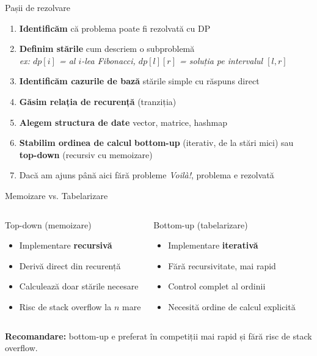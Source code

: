 \documentclass{beamer}
\begin{document}
\begin{frame}{Pașii de rezolvare}
  \begin{enumerate}
    \footnotesize\itemsep2pt
    \item \textbf{Identificăm} că problema poate fi rezolvată cu DP
    \item \textbf{Definim stările} \textemdash{} cum descriem o subproblemă \\
          \textit{ex: $dp[i]$ = al $i$-lea Fibonacci, $dp[l][r]$ = soluția pe intervalul $[l,r]$}
    \item \textbf{Identificăm cazurile de bază} \textemdash{} stările simple cu răspuns direct
    \item \textbf{Găsim relația de recurență} (tranziția)
    \item \textbf{Alegem structura de date} \textemdash{} vector, matrice, hashmap
    \item \textbf{Stabilim ordinea de calcul} \textemdash{} \textbf{bottom-up} (iterativ,
          de la stări mici) sau \textbf{top-down} (recursiv cu memoizare)
    \item Dacă am ajuns până aici fără probleme \textemdash{} \textit{Voilà!}, problema e rezolvată
  \end{enumerate}
\end{frame}

\begin{frame}{Memoizare vs. Tabelarizare}
  \begin{columns}[T]
    \begin{block}{Top-down (memoizare)}
      \begin{itemize}
        \footnotesize\itemsep0pt
        \item Implementare \textbf{recursivă}
        \item[+] Derivă direct din recurență
        \item[+] Calculează doar stările necesare
        \item[$-$] Risc de stack overflow la $n$ mare
      \end{itemize}
    \end{block}
    \begin{block}{Bottom-up (tabelarizare)}
      \begin{itemize}
        \footnotesize\itemsep0pt
        \item Implementare \textbf{iterativă}
        \item[+] Fără recursivitate, mai rapid
        \item[+] Control complet al ordinii
        \item[$-$] Necesită ordine de calcul explicită
      \end{itemize}
    \end{block}
  \end{columns}
  \smallskip
  \textbf{Recomandare:} bottom-up e preferat în competiții \textemdash{}
  mai rapid și fără risc de stack overflow.
\end{frame}
\end{document}
